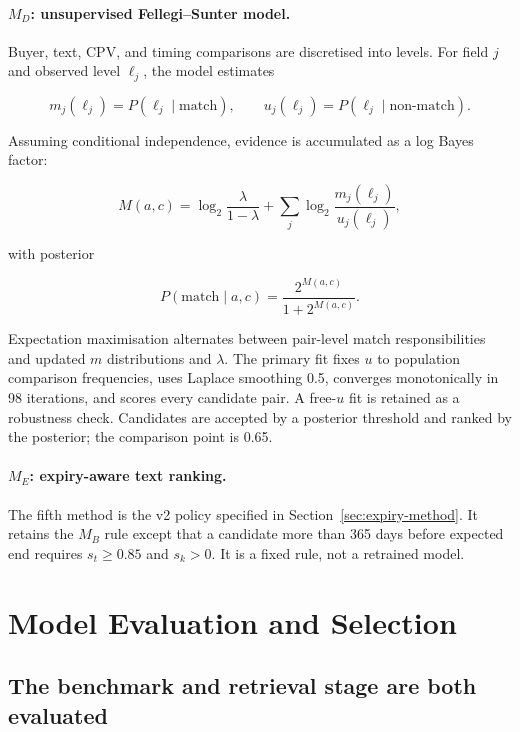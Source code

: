 \documentclass[11pt,a4paper]{article}
\begin{document}
\paragraph{$M_D$: unsupervised Fellegi--Sunter model.}
Buyer, text, CPV, and timing comparisons are discretised into levels. For field $j$
and observed level $\ell_j$, the model estimates

\begin{equation}
m_j(\ell_j)=P(\ell_j\mid\text{match}),\qquad
u_j(\ell_j)=P(\ell_j\mid\text{non-match}).
\end{equation}

Assuming conditional independence, evidence is accumulated as a log Bayes factor:

\begin{equation}
M(a,c)=\log_2\frac{\lambda}{1-\lambda}
+\sum_j\log_2\frac{m_j(\ell_j)}{u_j(\ell_j)},
\end{equation}

with posterior

\begin{equation}
P(\text{match}\mid a,c)=\frac{2^{M(a,c)}}{1+2^{M(a,c)}}.
\end{equation}

Expectation maximisation alternates between pair-level match responsibilities and
updated $m$ distributions and $\lambda$. The primary fit fixes $u$ to population
comparison frequencies, uses Laplace smoothing 0.5, converges monotonically in 98
iterations, and scores every candidate pair. A free-$u$ fit is retained as a
robustness check. Candidates are accepted by a posterior threshold and ranked by the
posterior; the comparison point is 0.65.

\paragraph{$M_E$: expiry-aware text ranking.}
The fifth method is the v2 policy specified in Section~\ref{sec:expiry-method}. It
retains the $M_B$ rule except that a candidate more than 365 days before expected end
requires $s_t\ge0.85$ and $s_k>0$. It is a fixed rule, not a retrained model.

\section{Model Evaluation and Selection}

\subsection{The benchmark and retrieval stage are both evaluated}
\end{document}
